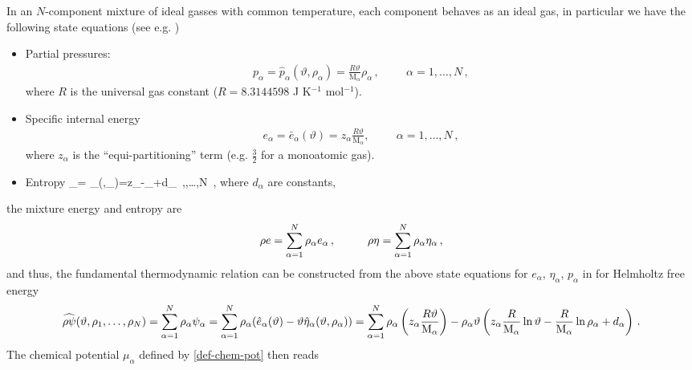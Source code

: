 \documentclass[a4paper]{article}
\begin{document}
In an $N$-component mixture of ideal gasses with common temperature, each component behaves as an ideal gas, in particular we have the following state equations (see e.g. \cite{callen.hb:thermodynamics})
\begin{itemize}
\item Partial pressures:
\begin{align}
\label{eq:ideal-mix-p-alpha}	
	p_\alpha = \hat{p}_\alpha(\vartheta,\rho_\alpha) = \frac{R\vartheta}{\mathrm{M}_\alpha}\rho_\alpha\,,\hspace{1cm}\alpha=1,\dots,N\,,
\end{align}
where $R$ is the universal gas constant ($R=8.3144598$ J K$^{-1}$ mol$^{-1}$).
\item
Specific internal energy
\begin{align}
\label{app-ienergy-eos}
e_\alpha = \bar{e}_\alpha(\vartheta)= z_\alpha\frac{R\vartheta}{\mathrm{M}_\alpha} ,\hspace{1cm}\alpha=1,\dots,N\,,
\end{align}
where $z_\alpha$ is the ``equi-partitioning'' term (e.g. $\frac{3}{2}$ for a monoatomic gas).
\item Entropy
\be
\eta_\alpha = \hat{\eta}_\alpha(\vartheta,\rho_\alpha)=z_\alpha{}\ln\vartheta-\ln\rho_\alpha +d_\alpha\ ,\hspace{1cm},\dots,N\ ,
\ee
where $d_\alpha$ are constants,
\end{itemize}
the mixture energy and entropy are
\begin{align}
\rho e = \sum_{\alpha=1}^N \rho_\alpha e_\alpha\,,\hspace{1cm}\rho\eta = \sum_{\alpha=1}^N \rho_\alpha\eta_\alpha\,,
\end{align}
and thus, the fundamental thermodynamic relation can be constructed from the above state equations for $e_\alpha$, $\eta_\alpha$, $p_\alpha$ in for Helmholtz free energy
\begin{align}
\label{eq:chem-Helmholtz}
\widehat{\rho\psi}(\vartheta,\rho_1,\dots,\rho_N)=\sum_{\alpha=1}^N \rho_\alpha\psi_\alpha =\sum_{\alpha=1}^N \rho_\alpha(\hat{e}_\alpha(\vartheta)-\vartheta\hat{\eta}_\alpha(\vartheta,\rho_\alpha))=
\sum_{\alpha=1}^N \rho_\alpha\left(z_\alpha \frac{R\vartheta}{\mathrm{M}_\alpha}\right)-\rho_\alpha\vartheta\left(z_\alpha\frac{R}{\mathrm{M}_\alpha}\ln\vartheta-\frac{R}{\mathrm{M}_\alpha}\ln\rho_\alpha + d_\alpha\right)\,.
\end{align}
The chemical potential $\mu_\alpha$ defined by \eqref{def-chem-pot} then reads
\end{document}
